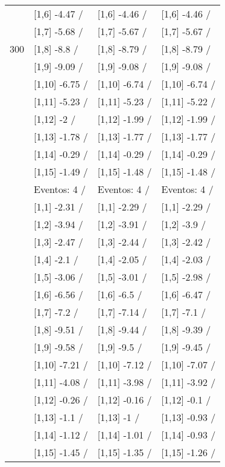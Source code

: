 \begin{table}
\begin{tabular}[t]{llll}
 & {}[1,6] -4.47  / & {}[1,6] -4.46  / & {}[1,6] -4.46  /\\
 & {}[1,7] -5.68  / & {}[1,7] -5.67  / & {}[1,7] -5.67  /\\
300 & {}[1,8] -8.8  / & {}[1,8] -8.79  / & {}[1,8] -8.79  /\\
\addlinespace
 & {}[1,9] -9.09  / & {}[1,9] -9.08  / & {}[1,9] -9.08  /\\
 & {}[1,10] -6.75  / & {}[1,10] -6.74  / & {}[1,10] -6.74  /\\
 & {}[1,11] -5.23  / & {}[1,11] -5.23  / & {}[1,11] -5.22  /\\
 & {}[1,12] -2  / & {}[1,12] -1.99  / & {}[1,12] -1.99  /\\
 & {}[1,13] -1.78  / & {}[1,13] -1.77  / & {}[1,13] -1.77  /\\
\addlinespace
 & {}[1,14] -0.29  / & {}[1,14] -0.29  / & {}[1,14] -0.29  /\\
 & {}[1,15] -1.49  / & {}[1,15] -1.48  / & {}[1,15] -1.48  /\\
 & Eventos:  4 / & Eventos:  4 / & Eventos:  4 /\\
 & {}[1,1] -2.31  / & {}[1,1] -2.29  / & {}[1,1] -2.29  /\\
 & {}[1,2] -3.94  / & {}[1,2] -3.91  / & {}[1,2] -3.9  /\\
\addlinespace
 & {}[1,3] -2.47  / & {}[1,3] -2.44  / & {}[1,3] -2.42  /\\
 & {}[1,4] -2.1  / & {}[1,4] -2.05  / & {}[1,4] -2.03  /\\
 & {}[1,5] -3.06  / & {}[1,5] -3.01  / & {}[1,5] -2.98  /\\
 & {}[1,6] -6.56  / & {}[1,6] -6.5  / & {}[1,6] -6.47  /\\
 & {}[1,7] -7.2  / & {}[1,7] -7.14  / & {}[1,7] -7.1  /\\
\addlinespace
500 & {}[1,8] -9.51  / & {}[1,8] -9.44  / & {}[1,8] -9.39  /\\
 & {}[1,9] -9.58  / & {}[1,9] -9.5  / & {}[1,9] -9.45  /\\
 & {}[1,10] -7.21  / & {}[1,10] -7.12  / & {}[1,10] -7.07  /\\
 & {}[1,11] -4.08  / & {}[1,11] -3.98  / & {}[1,11] -3.92  /\\
 & {}[1,12] -0.26  / & {}[1,12] -0.16  / & {}[1,12] -0.1  /\\
\addlinespace
 & {}[1,13] -1.1  / & {}[1,13] -1  / & {}[1,13] -0.93  /\\
 & {}[1,14] -1.12  / & {}[1,14] -1.01  / & {}[1,14] -0.93  /\\
 & {}[1,15] -1.45  / & {}[1,15] -1.35  / & {}[1,15] -1.26  /\\
\bottomrule
\end{tabular}
\end{table}
